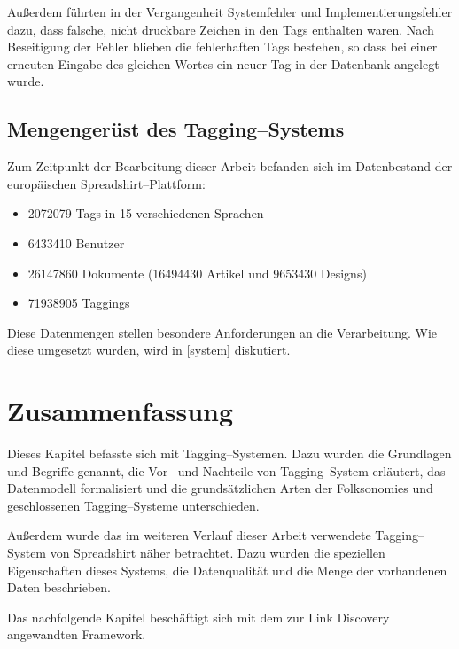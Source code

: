 Außerdem führten in der Vergangenheit Systemfehler und Implementierungsfehler dazu, dass falsche, nicht druckbare Zeichen in den Tags enthalten waren. Nach Beseitigung der Fehler blieben die fehlerhaften Tags bestehen, so dass bei einer erneuten Eingabe des gleichen Wortes ein neuer Tag in der Datenbank angelegt wurde.

\subsection{Mengengerüst des Tagging--Systems}
\label{tag_amount}

Zum Zeitpunkt der Bearbeitung dieser Arbeit befanden sich im Datenbestand der europäischen Spreadshirt--Plattform:

\begin{itemize}
    \item \num{2072079} Tags in \num{15} verschiedenen Sprachen
    \item \num{6433410} Benutzer
    \item \num{26147860} Dokumente (\num{16494430} Artikel und \num{9653430} Designs)
    \item \num{71938905} Taggings
\end{itemize}

Diese Datenmengen stellen besondere Anforderungen an die Verarbeitung. Wie diese umgesetzt wurden, wird in \cref{system} diskutiert.

\section{Zusammenfassung}

Dieses Kapitel befasste sich mit Tagging--Systemen. Dazu wurden die Grundlagen und Begriffe genannt, die Vor-- und Nachteile von Tagging--System erläutert, das Datenmodell formalisiert und die grundsätzlichen Arten der Folksonomies und geschlossenen Tagging--Systeme unterschieden.

Außerdem wurde das im weiteren Verlauf dieser Arbeit verwendete Tagging--System von Spreadshirt \cite{sprd2013} näher betrachtet. Dazu wurden die speziellen Eigenschaften dieses Systems, die Datenqualität und die Menge der vorhandenen Daten beschrieben.

Das nachfolgende Kapitel beschäftigt sich mit dem zur Link Discovery angewandten Framework.